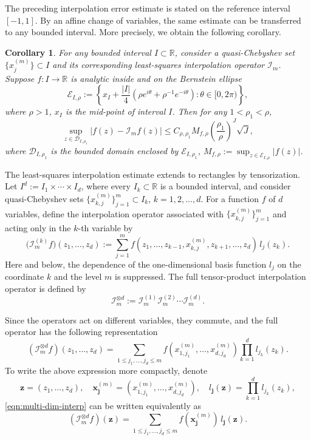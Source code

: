 \documentclass{article}
\numberwithin{equation}{section}
\newtheorem{corollary}{Corollary}
\def\RR{\mathbb{R}}
\def\lt{\left}
\def\rt{\right}
\def\bx{{\bm x}}
\def\bj{{\bm j}}
\begin{document}
The preceding interpolation error estimate is stated on the reference interval \([-1,1]\). By an affine change of variables, the same estimate can be transferred to any bounded interval. More precisely, we obtain the following corollary.

\begin{corollary}\label{cor:least-square-interp}
    For any bounded interval $I\subset \RR$, consider a quasi-Chebyshev set $\{x_j^{(m)}\}\subset I$ and its corresponding least-squares interpolation operator $\mathcal I_m$. Suppose $f\colon I\to\RR$ is analytic inside and on the Bernstein ellipse 
    $$\mathcal{E}_{I,\rho} :=\lt\{x_I + \frac{|I|}{4}(\rho e^{i\theta} + \rho^{-1} e^{-i\theta}):\theta\in [0,2\pi)\rt\},$$ where $\rho>1$, $x_I$ is the mid-point of interval $I$. Then for any $1<\rho_1<\rho$, 
    $$\sup_{z\in \mathcal{D}_{I,\rho_1}} |f(z)-\mathcal I_m f(z)|\leq C_{\rho,\rho_1}M_{f,\rho}  \lt(\frac{\rho_1}{\rho}\rt)^J \sqrt{J},$$
    where $\mathcal{D}_{I,\rho_1}$ is the bounded domain enclosed by $\mathcal{E}_{I,\rho_1}$, $M_{f,\rho}:=\sup_{z\in\mathcal{E}_{I,\rho}} |f(z)|$.
\end{corollary}

The least-squares interpolation estimate extends to rectangles by tensorization. Let $I^d:= I_1\times\cdots\times I_d$, where every $I_k\subset\RR$ is a bounded interval, and consider quasi-Chebyshev sets $\{x_{k,j}^{(m)}\}_{j=1}^m \subset I_k$, $k=1,2,\ldots,d$. For a function \(f\) of \(d\) variables, define the interpolation operator associated with $\{x_{k,j}^{(m)}\}_{j=1}^m$ and acting only in the \(k\)-th variable by
\[
\bigl(\mathcal{I}_m^{(k)}f\bigr)(z_1,\dots,z_d)
:=
\sum_{j=1}^{m}
f(z_1,\dots,z_{k-1},{x_{k,j}^{(m)}},z_{k+1},\dots,z_d)\,l_j(z_k).
\]
Here and below, the dependence of the one-dimensional basis function $l_j$ on the coordinate $k$ and the level $m$ is suppressed.
The full tensor-product interpolation operator is defined by
\begin{equation}
    \mathcal{I}_m^{\otimes d}
:=
\mathcal{I}_m^{(1)}\mathcal{I}_m^{(2)}\cdots\mathcal{I}_m^{(d)}.
\end{equation}

Since the operators act on different variables, they commute, and the full operator has the following representation
\begin{equation}\label{eqn:multi-dim-interp}
    \lt(\mathcal{I}_m^{\otimes d}f\rt)(z_1,\dots,z_d) = \sum_{1\leq j_1,\ldots,j_d\leq m} 
    f\lt(x_{1,j_1}^{(m)},\ldots,x_{d,j_d}^{(m)}\rt) \prod_{k=1}^d l_{j_k}(z_k).
\end{equation}
To write the above expression more compactly, denote 
$${\bm z} = (z_1,\ldots,z_d),\quad \bx_\bj^{(m)} = \lt(x_{1,j_1}^{(m)},\ldots,x_{d,j_d}^{(m)}\rt),\quad l_\bj({\bm z}) = \prod_{k=1}^d l_{j_k}(z_k),$$ \eqref{eqn:multi-dim-interp} can be written equivalently as
\begin{equation}
    \lt(\mathcal{I}_m^{\otimes d}f\rt)({\bm z}) = \sum_{1\leq j_1,\ldots,j_d\leq m} 
    f(\bx_\bj^{(m)})\, l_\bj({\bm z}).
\end{equation}
\end{document}

